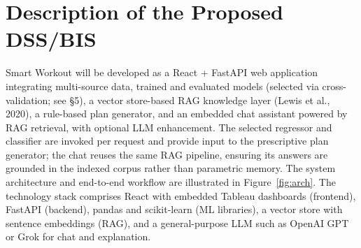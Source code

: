 \documentclass[11pt,a4paper]{article}
\begin{document}
\section{Description of the Proposed DSS/BIS}
Smart Workout will be developed as a React + FastAPI web application integrating multi-source data, trained and evaluated models (selected via cross-validation; see \S5), a vector store-based RAG knowledge layer (Lewis et al., 2020), a rule-based plan generator, and an embedded chat assistant powered by RAG retrieval, with optional LLM enhancement. The selected regressor and classifier are invoked per request and provide input to the prescriptive plan generator; the chat reuses the same RAG pipeline, ensuring its answers are grounded in the indexed corpus rather than parametric memory. The system architecture and end-to-end workflow are illustrated in Figure~\ref{fig:arch}. The technology stack comprises React with embedded Tableau dashboards (frontend), FastAPI (backend), pandas and scikit-learn (ML libraries), a vector store with sentence embeddings (RAG), and a general-purpose LLM such as OpenAI GPT or Grok for chat and explanation.
\end{document}

